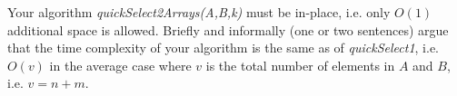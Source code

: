 \documentclass[12pt]{article}
\begin{document}
	\bigskip
	
	\noindent Your algorithm \emph{quickSelect2Arrays(A,B,k)} must be in-place, i.e. only $O(1)$ additional space is allowed.
	Briefly and informally (one or two sentences) argue that the time complexity of your algorithm is the same as of \emph{quickSelect1}, i.e. $O(v)$ in the average case where $v$ is the total number of elements in $A$ and $B$, i.e. $v=n+m$.
	
\end{document}
